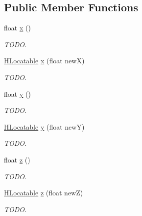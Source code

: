 \subsection*{Public Member Functions}
\begin{DoxyCompactItemize}
\item 
float \hyperlink{interfacehype_1_1interfaces_1_1_h_locatable_a4cded539ff26919e3549d0c20b485d59}{x} ()
\begin{DoxyCompactList}\small\item\em T\-O\-D\-O. \end{DoxyCompactList}\item 
\hyperlink{interfacehype_1_1interfaces_1_1_h_locatable}{H\-Locatable} \hyperlink{interfacehype_1_1interfaces_1_1_h_locatable_aa82e61c898f42d08e057154987d71b2c}{x} (float new\-X)
\begin{DoxyCompactList}\small\item\em T\-O\-D\-O. \end{DoxyCompactList}\item 
float \hyperlink{interfacehype_1_1interfaces_1_1_h_locatable_a6e166a2021677c992c2a1cbd66b27418}{y} ()
\begin{DoxyCompactList}\small\item\em T\-O\-D\-O. \end{DoxyCompactList}\item 
\hyperlink{interfacehype_1_1interfaces_1_1_h_locatable}{H\-Locatable} \hyperlink{interfacehype_1_1interfaces_1_1_h_locatable_a1af2c3ed77da91cc48b939c8e3bdaf83}{y} (float new\-Y)
\begin{DoxyCompactList}\small\item\em T\-O\-D\-O. \end{DoxyCompactList}\item 
float \hyperlink{interfacehype_1_1interfaces_1_1_h_locatable_a535ac198558b7bc4ad45aa906c93302a}{z} ()
\begin{DoxyCompactList}\small\item\em T\-O\-D\-O. \end{DoxyCompactList}\item 
\hyperlink{interfacehype_1_1interfaces_1_1_h_locatable}{H\-Locatable} \hyperlink{interfacehype_1_1interfaces_1_1_h_locatable_aa564f23ecbac52a2fe20e4ff47ddef05}{z} (float new\-Z)
\begin{DoxyCompactList}\small\item\em T\-O\-D\-O. \end{DoxyCompactList}\end{DoxyCompactItemize}


